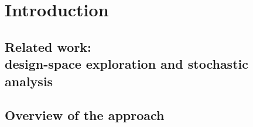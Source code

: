 \chapter{Introduction}
\label{chap:intro}


\section[Related work: design-space exploration and stochastic analysis]{Related work:\\design-space exploration and stochastic analysis}
\label{sec:intro:relwork}

\section{Overview of the approach}
\label{sec:intro:approach}


